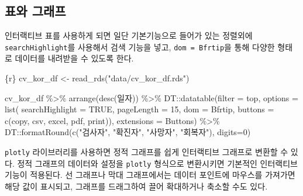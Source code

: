 \documentclass[
  letterpaper,
]{book}
\newenvironment{Shaded}{\begin{snugshade}}{\end{snugshade}}
\newcommand{\InformationTok}[1]{\textcolor[rgb]{0.37,0.37,0.37}{#1}}
\begin{document}
\hypertarget{corona-korea-table}{%
\subsection{표와 그래프}\label{corona-korea-table}}

인터랙티브 표를 사용하게 되면 일단 기본기능으로 들어가 있는 정렬외에
\texttt{searchHighlight}를 사용해서 검색 기능을 넣고,
\texttt{dom\ =\ \textquotesingle{}Bfrtip\textquotesingle{}}을 통해
다양한 형태로 데이터를 내려받을 수 있도록 한다.

\begin{Shaded}
\begin{Highlighting}[]
\InformationTok{\textasciigrave{}\textasciigrave{}\textasciigrave{}\{r\}}
\InformationTok{cv\_kor\_df  \textless{}{-}  }
\InformationTok{  read\_rds("data/cv\_kor\_df.rds")}

\InformationTok{cv\_kor\_df \%\textgreater{}\%}
\InformationTok{  arrange(desc(일자)) \%\textgreater{}\% }
\InformationTok{  DT::datatable(filter = \textquotesingle{}top\textquotesingle{},  }
\InformationTok{          options = list(   searchHighlight = TRUE, pageLength = 15,}
\InformationTok{                            dom = \textquotesingle{}Bfrtip\textquotesingle{},}
\InformationTok{                            buttons = c(\textquotesingle{}copy\textquotesingle{}, \textquotesingle{}csv\textquotesingle{}, \textquotesingle{}excel\textquotesingle{}, \textquotesingle{}pdf\textquotesingle{}, \textquotesingle{}print\textquotesingle{})),}
\InformationTok{          extensions = \textquotesingle{}Buttons\textquotesingle{}) \%\textgreater{}\% }
\InformationTok{  DT::formatRound(c("검사자", "확진자", "사망자", "회복자"), digits=0)}
\InformationTok{\textasciigrave{}\textasciigrave{}\textasciigrave{}}
\end{Highlighting}
\end{Shaded}

\texttt{plotly} 라이브러리를 사용하면 정적 그래프를 쉽게 인터랙티브
그래프로 변환할 수 있다. 정적 그래프의 데이터와 설정을 \texttt{plotly}
형식으로 변환시키면 기본적인 인터랙티브 기능이 적용된다. 선 그래프나
막대 그래프에서는 데이터 포인트에 마우스를 가져가면 해당 값이 표시되고,
그래프를 드래그하여 끌어 확대하거나 축소할 수도 있다.
\end{document}
